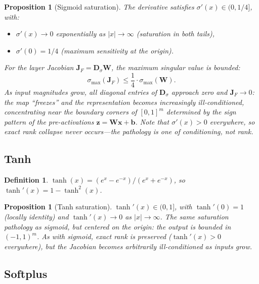 \documentclass[11pt,a4paper]{article}
\newtheorem{proposition}[theorem]{Proposition}
\newtheorem{definition}[theorem]{Definition}
\theoremstyle{remark}
\begin{document}
\begin{proposition}[Sigmoid saturation]
\label{prop:sigmoid-sat}
The derivative satisfies $\sigma'(x) \in (0, 1/4]$, with:
\begin{itemize}
  \item $\sigma'(x) \to 0$ exponentially as $|x| \to \infty$ (saturation in both tails),
  \item $\sigma'(0) = 1/4$ (maximum sensitivity at the origin).
\end{itemize}
For the layer Jacobian $\mathbf{J}_F = \mathbf{D}_\sigma \mathbf{W}$, the maximum singular value is bounded:
\begin{equation}
  \sigma_{\max}(\mathbf{J}_F) \leq \frac{1}{4} \cdot \sigma_{\max}(\mathbf{W}).
  \label{eq:sigmoid-bound}
\end{equation}
As input magnitudes grow, all diagonal entries of $\mathbf{D}_\sigma$ approach zero and $\mathbf{J}_F \to 0$: the map ``freezes'' and the representation becomes increasingly ill-conditioned, concentrating near the boundary corners of $[0,1]^m$ determined by the sign pattern of the pre-activations $\mathbf{z} = \mathbf{W}\mathbf{x} + \mathbf{b}$.
Note that $\sigma'(x) > 0$ everywhere, so \emph{exact} rank collapse never occurs---the pathology is one of conditioning, not rank.
\end{proposition}

\subsection{Tanh}

\begin{definition}
$\tanh(x) = (e^x - e^{-x})/(e^x + e^{-x})$, so $\tanh'(x) = 1 - \tanh^2(x)$.
\end{definition}

\begin{proposition}[Tanh saturation]
$\tanh'(x) \in (0, 1]$, with $\tanh'(0) = 1$ (locally identity) and $\tanh'(x) \to 0$ as $|x| \to \infty$.
The same saturation pathology as sigmoid, but centered on the origin: the output is bounded in $(-1, 1)^m$.
As with sigmoid, exact rank is preserved ($\tanh'(x) > 0$ everywhere), but the Jacobian becomes arbitrarily ill-conditioned as inputs grow.
\end{proposition}

\subsection{Softplus}
\end{document}
